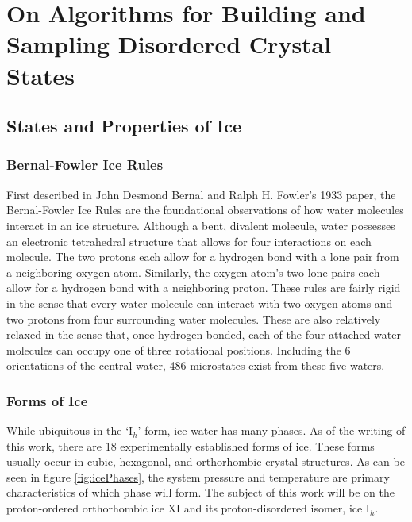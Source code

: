 \chapter{On Algorithms for Building and Sampling Disordered Crystal States}
\label{ch:iceXI}

\section{States and Properties of Ice}


\subsection{Bernal-Fowler Ice Rules}

First described in John Desmond Bernal and Ralph H. Fowler's 1933 paper, the Bernal-Fowler Ice Rules are the foundational observations of how water molecules interact in an ice structure.\cite{BFIceOG}
Although a bent, divalent molecule, water possesses an electronic tetrahedral structure that allows for four interactions on each molecule.
The two protons each allow for a hydrogen bond with a lone pair from a neighboring oxygen atom.
Similarly, the oxygen atom's two lone pairs each allow for a hydrogen bond with a neighboring proton. 
These rules are fairly rigid in the sense that every water molecule can interact with two oxygen atoms and two protons from four surrounding water molecules.
These are also relatively relaxed in the sense that, once hydrogen bonded, each of the four attached water molecules can occupy one of three rotational positions. 
Including the 6 orientations of the central water, 486 microstates exist from these five waters.

\subsection{Forms of Ice}

While ubiquitous in the `I$_{h}$' form, ice water has many phases.
As of the writing of this work, there are 18 experimentally established forms of ice. 
These forms usually occur in cubic, hexagonal, and orthorhombic crystal structures.
As can be seen in figure \ref{fig:icePhases}, the system pressure and temperature are primary characteristics of which phase will form.
The subject of this work will be on the proton-ordered orthorhombic ice XI and its proton-disordered isomer, ice I$_{h}$.

